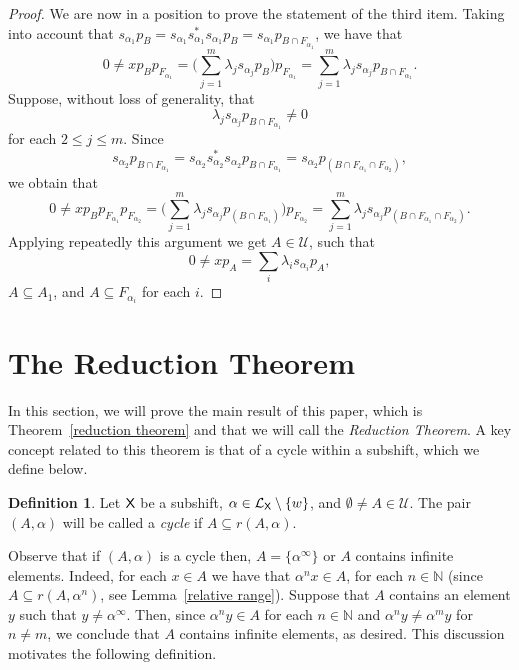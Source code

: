 \documentclass[a4paper,12pt]{amsart}
\theoremstyle{definition}
\newtheorem{definition}[equation]{Definition}
\theoremstyle{remark}
\numberwithin{equation}{section}
\newcommand{\osf}{{\normalfont \textsf{X}}}
\newcommand{\lang}{\CL_{\osf}}
\newcommand{\N}{\mathbb{N}}
\newcommand{\CL}{\mathcal{L}}
\newcommand{\TCB}{\mathcal{U}}
\begin{document}
\begin{proof}
 We are now in a position to prove the statement of the third item. Taking into account that $s_{\alpha_1}p_B=s_{\alpha_1}s_{\alpha_1}^*s_{\alpha_1}p_B=s_{\alpha_1}p_{B\cap F_{{\alpha}_1}}$,
we have that $$0\neq xp_Bp_{F_{\alpha_1}} = \big(\sum\limits_{j=1}^m \lambda_j s_{\alpha_j}p_{B}\big)p_{F_{\alpha_1}}= \sum\limits_{j=1}^m \lambda_j s_{\alpha_j}p_{B\cap F_{\alpha_1}}.$$ 
Suppose, without loss of generality, that $$\lambda_j s_{\alpha_j}p_{B\cap F_{\alpha_1}}\neq 0$$ for each $2\leq j \leq m$. Since $$s_{\alpha_2}p_{B\cap F_{\alpha_1}}=s_{\alpha_2}s_{\alpha_2}^*s_{\alpha_2}p_{B\cap F_{\alpha_1}}=s_{\alpha_2}p_{(B\cap F_{\alpha_1}\cap F_{\alpha_2})},$$ we obtain that
$$0\neq xp_Bp_{F_{\alpha_1}}p_{F_{\alpha_2}} = \big(\sum\limits_{j=1}^m\lambda_j s_{\alpha_j}p_{(B\cap F_{\alpha_1})}\big)p_{F_{\alpha_2}}=\sum\limits_{j=1}^m\lambda_j s_{\alpha_j}p_{(B\cap F_{\alpha_1}\cap F_{\alpha_2})}.$$
Applying repeatedly this argument we get $A \in \TCB$, such that 
$$0\neq xp_A=\sum\limits_i \lambda_i s_{\alpha_i}p_A,$$ $A\subseteq A_1$, and $A\subseteq F_{\alpha_i}$ for each $i$. 
\end{proof}

\section{The Reduction Theorem}\label{reduction section}

In this section, we will prove the main result of this paper, which is Theorem~\ref{reduction theorem} and that we will call the \emph{Reduction Theorem}. A key concept related to this theorem is that of a cycle within a subshift, which we define below. 

\begin{definition}
    Let $\osf$ be a subshift, $\alpha\in \lang\setminus \{w\}$, and $\emptyset \neq A\in \TCB$. The pair $(A,\alpha)$ will be called  a \emph{cycle} if $A\subseteq r(A,\alpha)$.
\end{definition}

Observe that if $(A,\alpha)$ is a cycle then, $A=\{\alpha^\infty\}$ or $A$ contains infinite elements. Indeed, for each $x\in A$ we have that $\alpha^n x \in A$, for each $n\in \N$ (since $A\subseteq r(A,\alpha^n)$, see Lemma~\ref{relative range}). Suppose that $A$ contains an element $y$ such that $y\neq \alpha^\infty$. Then, since $\alpha^n y\in A$ for each $n\in \N$ and  $\alpha^n y\neq \alpha^m y$ for $n\neq m$, we conclude that $A$ contains infinite elements, as desired. This discussion motivates the following definition.
\end{document}
